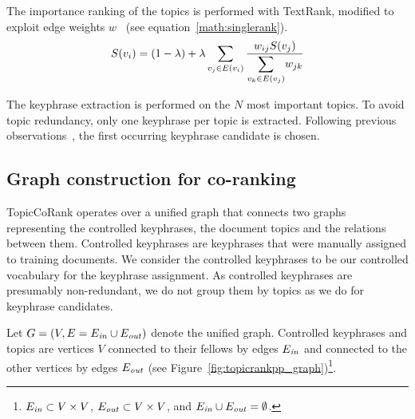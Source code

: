     The importance ranking of the topics is performed with TextRank, modified to exploit edge
    weights $w$~\cite{wan2008expandrank} (see equation~\ref{math:singlerank}).
    \begin{align}
      S(v_i) = (1 - \lambda) + \lambda \sum_{v_j \in E(v_i)}{\frac{w_{ij}S(v_j)}{\mathlarger\sum_{v_k \in E(v_j)}{w_{jk}}}}\label{math:singlerank}
    \end{align}
      
    The keyphrase extraction is performed on the $N$  most important topics. To
    avoid topic redundancy, only one
    keyphrase per topic is extracted.
    Following previous observations~\cite{witten1999kea},
    the first occurring keyphrase candidate is chosen.

  \subsection{Graph construction for co-ranking}
  \label{subsec:graph_construction}
    TopicCoRank operates over a unified graph that connects two graphs
    representing the controlled keyphrases, the document topics and
    the relations between them. Controlled keyphrases are keyphrases
    that were manually assigned to training documents. We consider the 
    controlled keyphrases
    to be our controlled vocabulary for the keyphrase assignment.
    As controlled keyphrases are presumably non-redundant, we do not 
    group them by topics as we do for keyphrase candidates.
    
    Let
    $G = (V, E=E_{\textnormal{\textit{in}}} \cup E_{\textnormal{\textit{out}}})$
    denote the unified graph. Controlled keyphrases and topics are vertices $V$
    connected to their fellows by edges $E_\textnormal{\textit{in}}$ and
    connected to the other vertices by edges $E_\textnormal{\textit{out}}$ (see
    Figure~\ref{fig:topicrankpp_graph})\footnote{$E_\textnormal{\textit{in}} \subset V \times V$, $E_\textnormal{\textit{out}} \subset V \times V$, and $E_\textnormal{\textit{in}} \cup E_\textnormal{\textit{out}} = \emptyset$.}.
    

